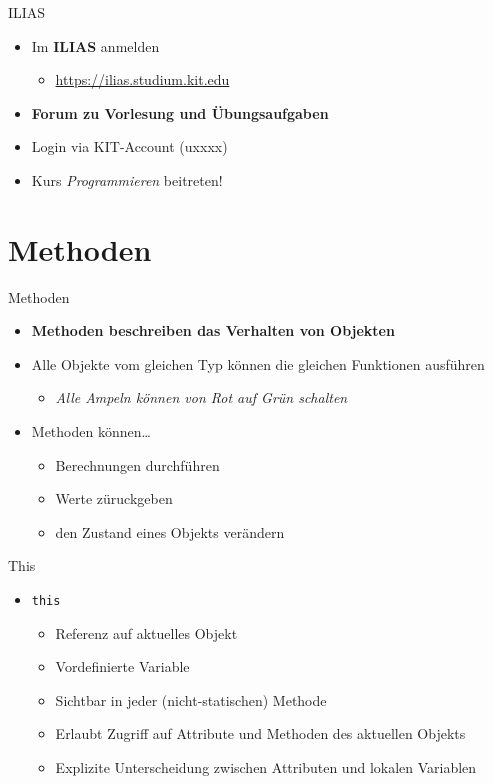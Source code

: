 \documentclass[18pt]{beamer}
\begin{document}
\begin{frame}{ILIAS}
    \begin{itemize}
        \item Im \textbf{ILIAS} anmelden
        \begin{itemize}
            \item \url{https://ilias.studium.kit.edu}
        \end{itemize}
        \item \textbf{Forum zu Vorlesung und Übungsaufgaben}
        \item Login via KIT-Account (uxxxx)
        \item \alert{Kurs \textit{Programmieren} beitreten!}
    \end{itemize}
\end{frame}



\section{Methoden}

\begin{frame}{Methoden}
    \begin{itemize}
        \item \textbf{Methoden beschreiben das Verhalten von Objekten}
        \item Alle Objekte vom gleichen Typ können die gleichen Funktionen ausführen
        \begin{itemize}
            \item \textit{Alle Ampeln können von Rot auf Grün schalten}
        \end{itemize}
        \vspace{.2in}
        \item Methoden können\dots
        \begin{itemize}
            \item Berechnungen durchführen
            \item Werte züruckgeben
            \item den Zustand eines Objekts verändern
        \end{itemize}
    \end{itemize}
\end{frame}

\begin{frame}{This}
    \begin{itemize}
        \item \Huge{\texttt{this}}
        \begin{itemize}
            \item Referenz auf aktuelles Objekt
            \item Vordefinierte Variable
            \item Sichtbar in jeder (nicht-statischen) Methode
            \item Erlaubt Zugriff auf Attribute und Methoden des aktuellen Objekts
            \item Explizite Unterscheidung zwischen Attributen und lokalen Variablen
        \end{itemize}
    \end{itemize}
\end{frame}
\end{document}
